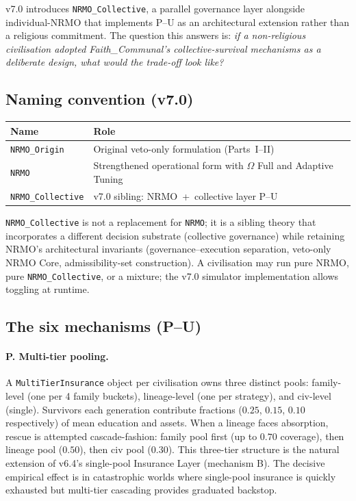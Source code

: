 v7.0 introduces \texttt{NRMO\_Collective}, a parallel governance
layer alongside individual-NRMO that implements P--U as an
architectural extension rather than a religious commitment. The
question this answers is: \emph{if a non-religious civilisation
adopted Faith\_Communal's collective-survival mechanisms as a
deliberate design, what would the trade-off look like?}

\subsection{Naming convention (v7.0)}

\begin{center}
\begin{tabular}{ll}
\toprule
Name & Role \\
\midrule
\texttt{NRMO\_Origin}     & Original veto-only formulation (Parts~I--II) \\
\texttt{NRMO}             & Strengthened operational form with $\Omega$ Full and Adaptive Tuning \\
\texttt{NRMO\_Collective} & v7.0 sibling: NRMO~+~collective layer P--U \\
\bottomrule
\end{tabular}
\end{center}

\texttt{NRMO\_Collective} is not a replacement for \texttt{NRMO}; it
is a sibling theory that incorporates a different decision substrate
(collective governance) while retaining NRMO's architectural
invariants (governance--execution separation, veto-only NRMO Core,
admissibility-set construction). A civilisation may run pure NRMO,
pure \texttt{NRMO\_Collective}, or a mixture; the v7.0 simulator
implementation allows toggling at runtime.

\subsection{The six mechanisms (P--U)}

\paragraph{P. Multi-tier pooling.}
A \texttt{MultiTierInsurance} object per civilisation owns three
distinct pools: family-level (one per 4 family buckets),
lineage-level (one per strategy), and civ-level (single). Survivors
each generation contribute fractions ($0.25$, $0.15$, $0.10$
respectively) of mean education and assets. When a lineage faces
absorption, rescue is attempted cascade-fashion: family pool first
(up to $0.70$ coverage), then lineage pool ($0.50$), then civ pool
($0.30$). This three-tier structure is the natural extension of v6.4's
single-pool Insurance Layer (mechanism B). The decisive empirical
effect is in catastrophic worlds where single-pool insurance is
quickly exhausted but multi-tier cascading provides graduated
backstop.

